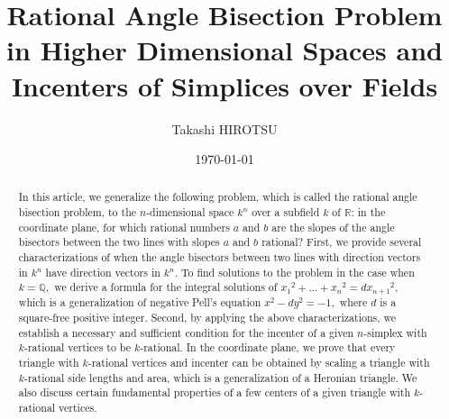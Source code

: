 \documentclass{article}
\title{Rational Angle Bisection Problem in Higher Dimensional Spaces and Incenters of Simplices over Fields}
\author{Takashi HIROTSU}
\date{\today}
\theoremstyle{definition}
\theoremstyle{plain}
\begin{document}
\maketitle
\begin{abstract}
In this article, we generalize the following problem, which is called the rational angle bisection problem, to the $n$-dimensional space $k^n$ over a subfield $k$ of $\mathbb R$: in the coordinate plane, for which rational numbers $a$ and $b$ are the slopes of the angle bisectors between the two lines with slopes $a$ and $b$ rational? 
First, we provide several characterizations of when the angle bisectors between two lines with direction vectors in $k^n$ have direction vectors in $k^n.$ 
To find solutions to the problem in the case when $k = \mathbb Q,$ we derive a formula for the integral solutions of $x_1{}^2+\dots +x_n{}^2 = dx_{n+1}{}^2,$ which is a generalization of negative Pell's equation $x^2-dy^2 = -1,$ where $d$ is a square-free positive integer. 
Second, by applying the above characterizations, we establish a necessary and sufficient condition for the incenter of a given $n$-simplex with $k$-rational vertices to be $k$-rational. 
In the coordinate plane, we prove that every triangle with $k$-rational vertices and incenter can be obtained by scaling a triangle with $k$-rational side lengths and area, which is a generalization of a Heronian triangle. 
We also discuss certain fundamental properties of a few centers of a given triangle with $k$-rational vertices.
\end{abstract}
\end{document}
